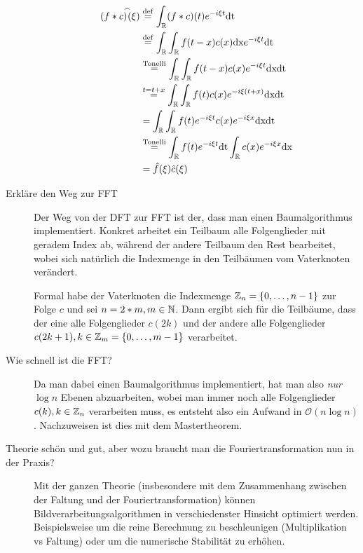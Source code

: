 \begin{description}
      \begin{equation*}
        \begin{split}
          (f*c)^{\widehat{}}(\xi) &\stackrel{\mathrm{def}}= \int_{\mathbb{R}} (f*c)(t) e^{-i\xi t}\text{dt} \\
          &\stackrel{\mathrm{def}}= \int_{\mathbb{R}} \int_{\mathbb{R}} f(t-x)c(x)\text{dx} e^{-i\xi t} \text{dt} \\
          &\stackrel{\mathrm{Tonelli}}= \int_{\mathbb{R}} \int_{\mathbb{R}} f(t-x)c(x) e^{-i\xi t} \text{dx}\text{dt} \\
          &\stackrel{t=t+x}= \int_{\mathbb{R}} \int_{\mathbb{R}} f(t)c(x) e^{-i\xi (t+x)} \text{dx}\text{dt} \\
          &= \int_{\mathbb{R}} \int_{\mathbb{R}} f(t)e^{-i\xi t} c(x) e^{-i\xi x} \text{dx}\text{dt} \\
          &\stackrel{\mathrm{Tonelli}}= \int_{\mathbb{R}} f(t)e^{-i\xi t} \text{dt}\int_{\mathbb{R}} c(x) e^{-i\xi x} \text{dx} \\ 
          &= \hat f(\xi) \hat c(\xi)
        \end{split}
      \end{equation*}

	\item[Erkläre den Weg zur FFT]
      Der Weg von der DFT zur FFT ist der, dass man einen Baumalgorithmus implementiert. Konkret arbeitet
      ein Teilbaum alle Folgenglieder mit geradem Index ab, während der andere Teilbaum den Rest bearbeitet,
      wobei sich natürlich die Indexmenge in den Teilbäumen vom Vaterknoten verändert.

      Formal habe der Vaterknoten die Indexmenge $\mathbb{Z}_n = \{0,\ldots,n-1\}$ zur Folge $c$ und sei $n=2*m, m\in\mathbb{N}$.
      Dann ergibt sich für die Teilbäume, dass der eine alle Folgenglieder $c(2k)$ und der andere alle Folgenglieder
      $c(2k+1), k \in \mathbb{Z}_m = \{0,\ldots,m-1\}$ verarbeitet.
	\item[Wie schnell ist die FFT?]
      Da man dabei einen Baumalgorithmus implementiert, hat man also \emph{nur} $\log n$ Ebenen abzuarbeiten, wobei
      man immer noch alle Folgenglieder $c(k),k\in\mathbb{Z}_n$ verarbeiten muss, es entsteht also ein Aufwand 
      in $\mathcal{O}(n \log n)$. Nachzuweisen ist dies mit dem Mastertheorem.
    \item[Theorie schön und gut, aber wozu braucht man die Fouriertransformation nun in der Praxis?]%
      Mit der ganzen Theorie (insbesondere mit dem Zusammenhang zwischen der Faltung und der Fouriertransformation)
      können Bildverarbeitungsalgorithmen in verschiedenster Hinsicht optimiert werden. Beispielsweise
      um die reine Berechnung zu beschleunigen (Multiplikation vs Faltung) oder um die numerische Stabilität
      zu erhöhen.


\end{description}
